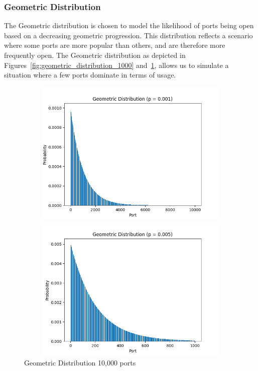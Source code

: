 \subsubsection{Geometric Distribution}

The Geometric distribution is chosen to model the likelihood of ports being open based on a decreasing geometric progression. This distribution reflects a scenario where some ports are more popular than others, and are therefore more frequently open. The Geometric distribution as depicted in Figures~\ref{fig:geometric_distribution_1000} and~\ref{fig:geometric_distribution_10000}, allows us to simulate a situation where a few ports dominate in terms of usage.

\begin{figure}[h]
\begin{adjustwidth}{-3cm}{-1cm}
\centering
\begin{minipage}{.45\textwidth}
  \centering
\includegraphics[width=12cm, height=7cm, keepaspectratio]{entropy/img/geometric_distribution_1000.png}
    \caption{Geometric Distribution 1,000 ports}
    \label{fig:geometric_distribution_1000}
\end{minipage}
\hspace{0.5cm}
\begin{minipage}{.45\textwidth}
\includegraphics[width=12cm, height=7cm, keepaspectratio]{entropy/img/geometric_distribution_10000.png}
    \caption{Geometric Distribution 10,000 ports}
    \label{fig:geometric_distribution_10000}
\end{minipage}
\end{adjustwidth}
\end{figure}

